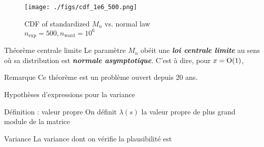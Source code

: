 \begin{frame}
	\begin{figure}[H]
		\centering
		\texttt{[image: ./figs/cdf\_1e6\_500.png]}
		\captionsetup{justification=centering,margin=2cm}
		\caption{CDF of standardized $M_n$ vs. normal law\\
				$n_{\text{exp}} = 500, n_{\text{word}} = 10^6$}
		\label{fig:cdf}
	\end{figure} 
\end{frame}

\begin{frame}
	\begin{block}{Théorème
		centrale limite}
        Le paramètre $M_n$ obéit une 
		\emph{\bfseries loi centrale limite} au sens où 
		sa distribution est \emph{\bfseries normale asymptotique}.
        C'est à dire, pour $x = \grando(1)$,
        
	\end{block}
	
	\begin{block}{Remarque}
		\label{rmk:clt}
		Ce théorème
		est un problème ouvert depuis 20 ans.
	\end{block}
\end{frame}

\begin{frame}{Hypothèses d'expressions pour la variance}

		\begin{block}{Définition : valeur propre}
			On définit $\lambda(s)$ la valeur propre de plus 
			grand module de la matrice
			
		\end{block}

		\begin{block}{Variance}
			La variance dont on vérifie la plausibilité est  
		\end{block}
\end{frame}

